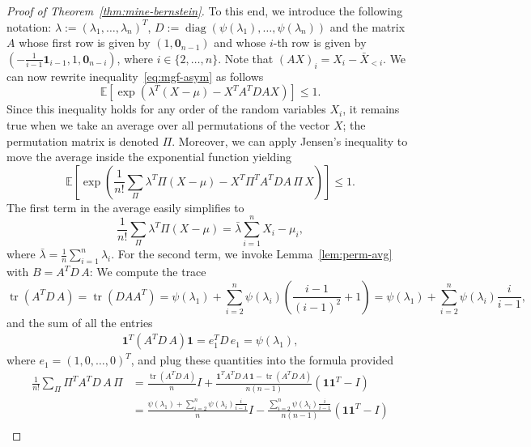 \documentclass[aos]{imsart2}
\theoremstyle{plain}
\theoremstyle{definition}
\newcommand{\one}{\mathbf{1}}
\newcommand{\zero}{\mathbf{0}}
\newcommand{\E}{\mathbb{E}}
\newcommand{\xb}{\bar{X}}
\DeclareMathOperator{\diag}{diag}
\DeclareMathOperator{\tr}{tr}
\begin{document}
\begin{appendix}
\begin{proof}[Proof of Theorem~\ref{thm:mine-bernstein}]
    To this end, we introduce the following notation: $\lambda := (\lambda_1,\ldots,\lambda_n)^T$, $D:=\diag(\psi(\lambda_1),\ldots,\psi(\lambda_n))$ and the matrix $A$ whose first row is given by $(1,\zero_{n-1})$ and whose $i$-th row is given by $(-\frac{1}{i-1} \one_{i-1},1,\zero_{n-i})$, where $i \in \{2,\ldots,n\}$. Note that $(AX)_i = X_i - \xb_{<i}$. We can now rewrite inequality~\eqref{eq:mgf-asym} as follows
    \begin{equation*}
        \E\left[\exp\left(\lambda^T(X-\mu)- X^T A^T D A X\right)\right] \leq 1.
    \end{equation*}
    Since this inequality holds for any order of the random variables $X_i$, it remains true when we take an average over all permutations of the vector $X$; the permutation matrix is denoted $\Pi$. Moreover, we can apply Jensen's inequality to move the average inside the exponential function yielding
    \begin{equation}\label{eq:mgf-pre-sym}
        \E\left[\exp\left(\frac{1}{n!}\sum_{\Pi}\lambda^T\Pi(X-\mu)- X^T\Pi^T A^T D A \,\Pi\,X\right)\right] \leq 1.
    \end{equation}
    The first term in the average easily simplifies to
    \begin{equation*}
        \frac{1}{n!}\sum_{\Pi}\lambda^T\Pi(X-\mu) = \bar{\lambda} \sum_{i=1}^n X_i-\mu_i,
    \end{equation*}
    where $\bar{\lambda} = \frac{1}{n}\sum_{i=1}^n \lambda_i$. For the second term, we invoke Lemma~\ref{lem:perm-avg} with $B=A^T D\, A$: We compute the trace
    \begin{equation*}
        \tr(A^T D\,A)= \tr(D AA^T)= \psi(\lambda_1) + \sum_{i=2}^n \psi(\lambda_i) \left(\frac{i-1}{(i-1)^2}+1\right) = \psi(\lambda_1) + \sum_{i=2}^n \psi(\lambda_i) \frac{i}{i-1},
    \end{equation*}
    and the sum of all the entries
    \begin{align*}
        \one^T (A^TD\,A) \one = e_1^T D\, e_1 = \psi(\lambda_1), 
    \end{align*}
    where $e_1 = (1,0,\ldots,0)^T$, and plug these quantities into the formula provided
    \begin{align*}
        \frac{1}{n!} \sum_{\Pi} \Pi^T A^T D\, A\, \Pi &= \frac{\tr(A^T D\, A)}{n} I +\frac{\one^TA^T D\, A\,\one-\tr(A^T D\, A)}{n(n-1)}(\one\one^T-I)\\
        &= \frac{\psi(\lambda_1)+\sum_{i=2}^n \psi(\lambda_i) \frac{i}{i-1}}{n}I - \frac{\sum_{i=2}^n \psi(\lambda_i) \frac{i}{i-1}}{n(n-1)}(\one\one^T-I)\\

\end{align*}
\end{proof}
\end{appendix}
\end{document}
